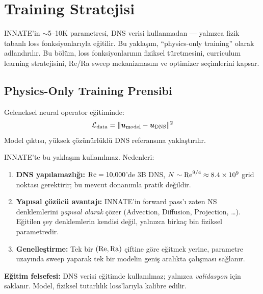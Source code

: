 
\chapter{Training Stratejisi}
\label{ch:training}

INNATE'in $\sim$5--10K parametresi, DNS verisi kullanmadan --- yalnızca fizik tabanlı loss fonksiyonlarıyla eğitilir. Bu yaklaşım, ``physics-only training'' olarak adlandırılır. Bu bölüm, loss fonksiyonlarının fiziksel türetmesini, curriculum learning stratejisini, Re/Ra sweep mekanizmasını ve optimizer seçimlerini kapsar.


\section{Physics-Only Training Prensibi}
\label{sec:physics_only}

Geleneksel neural operator eğitiminde:
\begin{equation}
    \mathcal{L}_{\text{data}} = \|\bm{u}_{\text{model}} - \bm{u}_{\text{DNS}}\|^2
    \label{eq:data_loss}
\end{equation}
Model çıktısı, yüksek çözünürlüklü DNS referansına yaklaştırılır.

INNATE'te bu yaklaşım kullanılmaz. Nedenleri:
\begin{enumerate}
    \item \textbf{DNS yapılamazlığı:} $\mathrm{Re} = 10{,}000$'de 3B DNS, $N \sim \mathrm{Re}^{9/4} \approx 8.4 \times 10^9$ grid noktası gerektirir; bu mevcut donanımla pratik değildir.
    \item \textbf{Yapısal çözücü avantajı:} INNATE'in forward pass'ı zaten NS denklemlerini \textit{yapısal olarak} çözer (Advection, Diffusion, Projection, \ldots). Eğitilen şey denklemlerin kendisi değil, yalnızca birkaç bin fiziksel parametredir.
    \item \textbf{Genelleştirme:} Tek bir $(\mathrm{Re}, \mathrm{Ra})$ çiftine göre eğitmek yerine, parametre uzayında sweep yaparak tek bir modelin geniş aralıkta çalışması sağlanır.
\end{enumerate}

\textbf{Eğitim felsefesi:} DNS verisi eğitimde kullanılmaz; yalnızca \textit{validasyon} için saklanır. Model, fiziksel tutarlılık loss'larıyla kalibre edilir.


